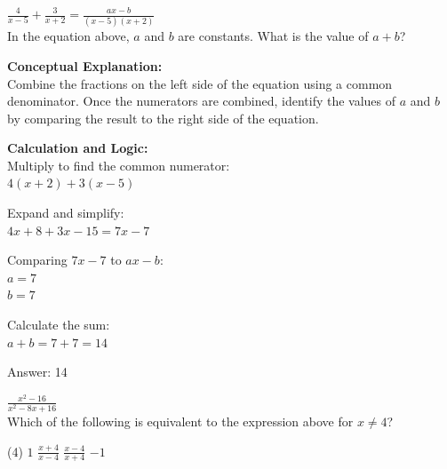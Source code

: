 \documentclass[11pt,paper=a4,answers]{exam}
\begin{document}
\begin{questions}
\vspace{40pt}

\question
$\frac{4}{x-5} + \frac{3}{x+2} = \frac{ax - b}{(x-5)(x+2)}$ \\
In the equation above, $a$ and $b$ are constants. What is the value of $a + b$?

\begin{solution}
\textbf{Conceptual Explanation:} \\
Combine the fractions on the left side of the equation using a common denominator. Once the numerators are combined, identify the values of $a$ and $b$ by comparing the result to the right side of the equation.

\vspace{20pt}

\textbf{Calculation and Logic:} \\
Multiply to find the common numerator: \\
$4(x+2) + 3(x-5)$

\vspace{10pt}

Expand and simplify: \\
$4x + 8 + 3x - 15 = 7x - 7$

\vspace{10pt}

Comparing $7x - 7$ to $ax - b$: \\
$a = 7$ \\
$b = 7$

\vspace{10pt}

Calculate the sum: \\
$a + b = 7 + 7 = 14$

\vspace{25pt}

Answer: \colorbox{yellow!100}{14}
\end{solution}

\vspace{40pt}

\question
$\frac{x^2 - 16}{x^2 - 8x + 16}$ \\
Which of the following is equivalent to the expression above for $x \neq 4$?
\begin{tasks}(4)
    \task $1$
    \task $\frac{x+4}{x-4}$
    \task $\frac{x-4}{x+4}$
    \task $-1$
\end{tasks}


\end{questions}
\end{document}
